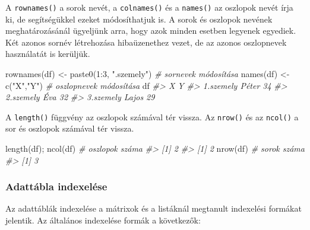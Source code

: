 \documentclass[
]{book}
\newenvironment{Shaded}{\begin{snugshade}}{\end{snugshade}}
\newcommand{\CommentTok}[1]{\textcolor[rgb]{0.56,0.35,0.01}{\textit{#1}}}
\newcommand{\DecValTok}[1]{\textcolor[rgb]{0.00,0.00,0.81}{#1}}
\newcommand{\FunctionTok}[1]{\textcolor[rgb]{0.00,0.00,0.00}{#1}}
\newcommand{\NormalTok}[1]{#1}
\newcommand{\OtherTok}[1]{\textcolor[rgb]{0.56,0.35,0.01}{#1}}
\newcommand{\SpecialCharTok}[1]{\textcolor[rgb]{0.00,0.00,0.00}{#1}}
\newcommand{\StringTok}[1]{\textcolor[rgb]{0.31,0.60,0.02}{#1}}
\begin{document}
A \texttt{rownames()} a sorok nevét, a \texttt{colnames()} és a \texttt{names()} az oszlopok nevét írja ki, de segítségükkel ezeket módosíthatjuk is. A sorok és oszlopok nevének meghatározásánál ügyeljünk arra, hogy azok minden esetben legyenek egyediek. Két azonos sornév létrehozása hibaüzenethez vezet, de az azonos oszlopnevek használatát is kerüljük.

\begin{Shaded}
\begin{Highlighting}[]
\FunctionTok{rownames}\NormalTok{(df) }\OtherTok{\textless{}{-}} \FunctionTok{paste0}\NormalTok{(}\DecValTok{1}\SpecialCharTok{:}\DecValTok{3}\NormalTok{, }\StringTok{".szemely"}\NormalTok{)   }\CommentTok{\# sornevek módosítása}
\FunctionTok{names}\NormalTok{(df) }\OtherTok{\textless{}{-}} \FunctionTok{c}\NormalTok{(}\StringTok{"X"}\NormalTok{,}\StringTok{"Y"}\NormalTok{)                   }\CommentTok{\# oszlopnevek módosítása}
\NormalTok{df}
\CommentTok{\#\textgreater{}               X  Y}
\CommentTok{\#\textgreater{} 1.szemely Péter 34}
\CommentTok{\#\textgreater{} 2.szemely   Éva 32}
\CommentTok{\#\textgreater{} 3.szemely Lajos 29}
\end{Highlighting}
\end{Shaded}

A \texttt{length()} függvény az oszlopok számával tér vissza. Az \texttt{nrow()} és az \texttt{ncol()} a sor és oszlopok számával tér vissza.

\begin{Shaded}
\begin{Highlighting}[]
\FunctionTok{length}\NormalTok{(df); }\FunctionTok{ncol}\NormalTok{(df)   }\CommentTok{\# oszlopok száma}
\CommentTok{\#\textgreater{} [1] 2}
\CommentTok{\#\textgreater{} [1] 2}
\FunctionTok{nrow}\NormalTok{(df)               }\CommentTok{\# sorok száma}
\CommentTok{\#\textgreater{} [1] 3}
\end{Highlighting}
\end{Shaded}

\hypertarget{adattuxe1bla-indexeluxe9se}{%
\subsubsection{Adattábla indexelése}\label{adattuxe1bla-indexeluxe9se}}

Az adattáblák indexelése a mátrixok és a listáknál megtanult indexelési formákat jelentik. Az általános indexelése formák a következők:

\begin{Shaded}
\end{Shaded}
\end{document}
